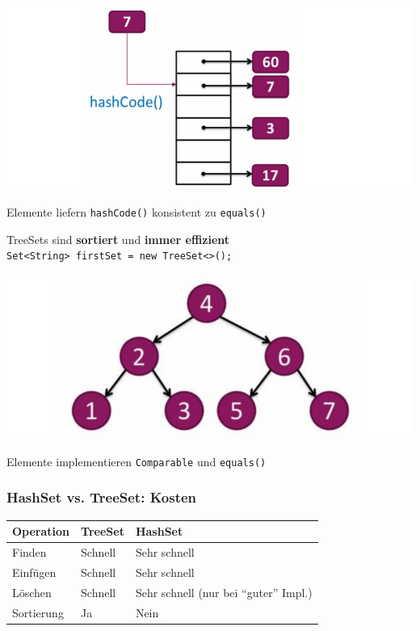 \begin{minipage}{0.5\columnwidth}
    \includegraphics[width=0.9\linewidth]{pictures/hashset.jpg}
\end{minipage}
\hfill
\begin{minipage}{0.45\columnwidth}
    Elemente liefern \verb|hashCode()| konsistent zu \verb|equals()|
\end{minipage}

TreeSets sind \textbf{sortiert} und \textbf{immer effizient}\\
\verb|Set<String> firstSet = new TreeSet<>();|

\begin{minipage}{0.5\columnwidth}
    \includegraphics[width=0.9\linewidth]{pictures/treeset.jpg}
\end{minipage}
\hfill
\begin{minipage}{0.45\columnwidth}
    Elemente implementieren \verb|Comparable| und \verb|equals()|
\end{minipage}

\subsubsection{HashSet vs. TreeSet: Kosten}
\begin{tabular}{l l l} \hline
    \textbf{Operation} & \textbf{TreeSet} & \textbf{HashSet }\\ \hline
    Finden      & \color{yellow!75!red} Schnell    & \color{green!80!black}Sehr schnell \\
    Einfügen    & \color{yellow!75!red} Schnell    & \color{green!80!black}Sehr schnell \\
    Löschen     & \color{yellow!75!red} Schnell    & \color{green!80!black}Sehr schnell (nur bei ``guter'' Impl.) \\
    Sortierung  & \color{green!80!black} Ja & \color{red}Nein                    \\
\end{tabular}

